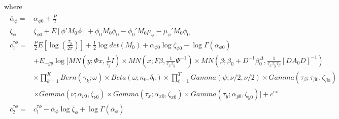\documentclass[11pt]{article}
\begin{document}
where
\begin{align*}
\begin{split}
	\overline{\alpha}_{\phi}=&\alpha_{\phi0}+\frac{P}{2}\\\overline{\zeta}_{\phi}=&\zeta_{\phi0}+E\left[\phi'M_{0}\phi\right]+\phi_{0}M_{0}\phi_{0}-\phi_{0}'M_{0}\mu_{\phi}-\mu_{\phi}'M_{0}\phi_{0}\\\overline{c}_{1}^{\tau\phi}=&\frac{P}{2}E\left[\log\left(\frac{\tau_{y}}{2\pi}\right)\right]+\frac{1}{2}\log det\left(M_{0}\right)+\alpha_{\phi0}\log\zeta_{\phi0}-\log\Gamma\left(\alpha_{\phi0}\right)\\&+E_{-gy}\log\Bigg[MN\left(y;\Phi x,\frac{1}{\tau_{y}}I\right)\times MN\left(x;F\beta,\frac{1}{\tau_{x}\tau_{y}}\Psi^{-1}\right)\times MN\left(\beta;\beta_{0}+D^{-1}\beta_{0}^{\Delta},\frac{1}{\tau_{x}\tau_{y}\tau_{\beta}}\left[DA_{0}D\right]^{-1}\right)\\&\times\prod_{k=1}^{K}Bern\left(\gamma_{k};\omega\right)\times Beta\left(\omega;\kappa_{0},\delta_{0}\right)\times\prod_{t=1}^{T}Gamma\left(\psi;\nu/2,\nu/2\right)\times Gamma\left(\tau_{\beta};\tau_{\beta0},\zeta_{\beta0}\right)\\&\times Gamma\left(\nu;\alpha_{\nu0},\zeta_{\nu0}\right)\times Gamma\left(\tau_{x};\alpha_{x0},\zeta_{x0}\right)\times Gamma\left(\tau_{y};\alpha_{y0},\zeta_{y0}\right)\Bigg]+c^{ev}\\\overline{c}_{2}^{\tau\phi}=&c_{1}^{\tau\phi}-\overline{\alpha}_{\phi}\log\overline{\zeta}_{\phi}+\log\Gamma\left(\overline{\alpha}_{\phi}\right)
\end{split}
\end{align*}
\end{document}
